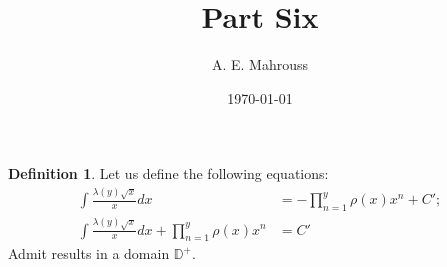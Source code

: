 \documentclass[10pt]{article}
\title{%
  \vspace{-1.5em}%
  \large\textbf{Part Six}%
}
\author{A. E. Mahrouss}
\date{\today}
\theoremstyle{plain}
\theoremstyle{definition}
\newtheorem{definition}[theorem]{Definition}
\theoremstyle{remark}
\begin{document}
\begin{definition}
	Let us define the following equations:
	\begin{align*}
		\int \frac{\lambda(y) \sqrt{x}}{x} dx &= - \prod_{n=1}^{y}\rho(x) x^{n} + C';\\
		\int \frac{\lambda(y) \sqrt{x}}{x} dx + \prod_{n=1}^{y}\rho(x) x^{n} &= C'
	\end{align*}
	Admit results in a domain $\mathbb{D}^{+}$.
\end{definition}

\nocite{*}


\end{document}
